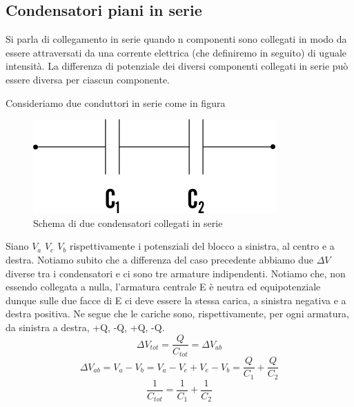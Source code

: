 \documentclass[
10pt, %
a4paper, %
oneside, %
headinclude,footinclude, %
BCOR5mm, %
]{scrartcl}
\begin{document}
\subsection*{Condensatori piani in serie}
\begin{definizione}
	Si parla di collegamento in serie quando n componenti sono collegati in modo da essere attraversati da una corrente elettrica (che definiremo in seguito) di uguale intensità. La differenza di potenziale dei diversi componenti collegati in serie può essere diversa per ciascun componente.
\end{definizione}
Consideriamo due conduttori in serie come in figura
\begin{figure}[h!]
	\centering
	\includegraphics[width=0.6\linewidth]{../images/Condensatori_serie}
	\caption{Schema di due condensatori collegati in serie}
	\label{fig:condensatoriserie}
\end{figure}
\FloatBarrier
Siano \(V_a\) \(V_e\) \(V_b\) rispettivamente i potensziali del blocco a sinistra, al centro e a destra. Notiamo subito che a differenza del caso precedente abbiamo due \(\Delta V\) diverse tra i condensatori e ci sono tre armature indipendenti. Notiamo che, non essendo collegata a nulla, l'armatura centrale E è neutra ed equipotenziale dunque sulle due facce di E ci deve essere la stessa carica, a sinistra negativa e a destra positiva. Ne segue che le cariche sono, rispettivamente, per ogni armatura, da sinistra a destra, +Q, -Q, +Q, -Q. 
\[\Delta V_{tot} = \frac{Q}{C_{tot}} = \Delta V_{ab}\]
\[\Delta V_{ab} = V_a-V_b=V_a-V_e+V_e-V_b = \frac{Q}{C_1}+\frac{Q}{C_2}\]
\[\frac{1}{C_{tot}} = \frac{1}{C_1} + \frac{1}{C_2}\]
\end{document}
